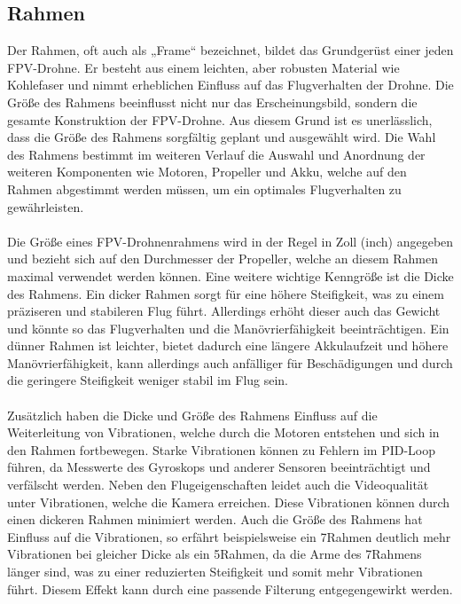     \subsection[Rahmen]{Rahmen}
        Der Rahmen, oft auch als „Frame“ bezeichnet, bildet das Grundgerüst einer jeden FPV-Drohne.
        Er besteht aus einem leichten, aber robusten Material wie Kohlefaser und nimmt erheblichen
        Einfluss auf das Flugverhalten der Drohne. Die Größe des Rahmens beeinflusst nicht nur das
        Erscheinungsbild, sondern die gesamte Konstruktion der FPV-Drohne. Aus diesem Grund ist es
        unerlässlich, dass die Größe des Rahmens sorgfältig geplant und ausgewählt wird. Die Wahl
        des Rahmens bestimmt im weiteren Verlauf die Auswahl und Anordnung der weiteren Komponenten
        wie Motoren, Propeller und Akku, welche auf den Rahmen abgestimmt werden müssen, um ein
        optimales Flugverhalten zu gewährleisten. \\
        \\
        Die Größe eines FPV-Drohnenrahmens wird in der Regel in Zoll (inch) angegeben und bezieht
        sich auf den Durchmesser der Propeller, welche an diesem Rahmen maximal verwendet werden
        können. Eine weitere wichtige Kenngröße ist die Dicke des Rahmens. Ein dicker Rahmen sorgt
        für eine höhere Steifigkeit, was zu einem präziseren und stabileren Flug führt. Allerdings
        erhöht dieser auch das Gewicht und könnte so das Flugverhalten und die Manövrierfähigkeit
        beeinträchtigen. Ein dünner Rahmen ist leichter, bietet dadurch eine längere Akkulaufzeit
        und höhere Manövrierfähigkeit, kann allerdings auch anfälliger für Beschädigungen und durch
        die geringere Steifigkeit weniger stabil im Flug sein. \\
        \\
        Zusätzlich haben die Dicke und Größe des Rahmens Einfluss auf die Weiterleitung von
        Vibrationen, welche durch die Motoren entstehen und sich in den Rahmen fortbewegen. Starke
        Vibrationen können zu Fehlern im PID-Loop führen, da Messwerte des Gyroskops und anderer
        Sensoren beeinträchtigt und verfälscht werden. Neben den Flugeigenschaften leidet auch die
        Videoqualität unter Vibrationen, welche die Kamera erreichen. Diese Vibrationen können durch
        einen dickeren Rahmen minimiert werden. Auch die Größe des Rahmens hat Einfluss auf die
        Vibrationen, so erfährt beispielsweise ein 7\dq Rahmen deutlich mehr Vibrationen bei gleicher
        Dicke als ein 5\dq Rahmen, da die Arme des 7\dq Rahmens länger sind, was zu einer reduzierten
        Steifigkeit und somit mehr Vibrationen führt. Diesem Effekt kann durch eine passende Filterung
        entgegengewirkt werden.
    
